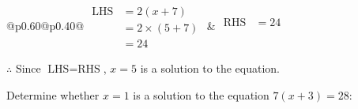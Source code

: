 \documentclass[12pt]{article}
\newcounter{minipagecount}
\begin{document}
\begin{multicols}{2}
\begin{minipage}[t]{0.40\textwidth}
    \renewcommand{\arraystretch}{1.3} %
    \begin{tabular}{@{}p{0.60\linewidth}@{}p{0.40\linewidth}@{}}
        \(\begin{aligned}
            \text{LHS} &= 2(x + 7) \\
                    &= 2 \times(5 + 7) \\
                    &= 24
        \end{aligned}\) &
        \(\begin{aligned}
            \text{RHS} &= 24\\
                    & \\
                    &
        \end{aligned}\)
    \end{tabular}
    \renewcommand{\arraystretch}{1.0} %
    \vspace{2pt}  %

    \noindent \(\therefore\) Since \(\text{LHS} = \text{RHS}\), \(x = 5\) is  a solution to the equation.

\end{minipage}

 \vspace*{16pt}
\noindent{(\theminipagecount)}\hspace{0.1mm} %
\begin{minipage}[t]{0.40\textwidth} %

    \noindent Determine whether \(x = 1\) is a solution to the equation \(7(x + 3) = 28\):
    \vspace{4pt}  %

    \noindent


\end{minipage}
\end{multicols}
\end{document}
